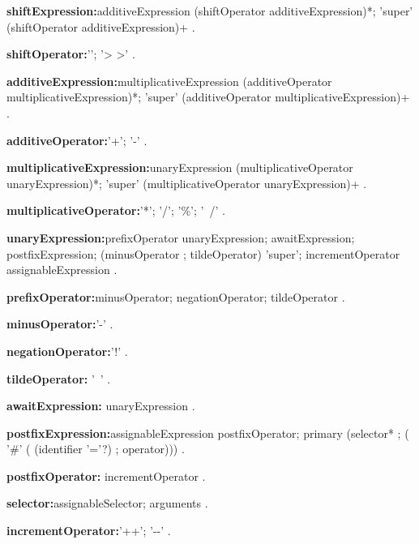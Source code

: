 \begin{grammar}
{\bf shiftExpression:}additiveExpression (shiftOperator additiveExpression)*;
      'super' (shiftOperator additiveExpression)+
    .

{\bf shiftOperator:}'\lt\lt';
       '> >' 
    .
 \end{grammar}
\begin{grammar}
{\bf additiveExpression:}multiplicativeExpression (additiveOperator multiplicativeExpression)*;
      'super' (additiveOperator multiplicativeExpression)+
    .

{\bf additiveOperator:}'+';
      '-'
    .
 \end{grammar}
\begin{grammar}
{\bf multiplicativeExpression:}unaryExpression (multiplicativeOperator unaryExpression)*;
      'super' (multiplicativeOperator unaryExpression)+
    .

{\bf multiplicativeOperator:}'*';
      '/';
      '\%';
      '~/'
    .
    
 \end{grammar}
\begin{grammar}
{\bf unaryExpression:}prefixOperator unaryExpression;
      awaitExpression;
      postfixExpression;
      (minusOperator ; tildeOperator) 'super';
      incrementOperator assignableExpression
    .
 
 {\bf prefixOperator:}minusOperator;
      negationOperator;
      tildeOperator
    .
       
       
  {\bf minusOperator:}'-'
  .


    {\bf negationOperator:}'!'
      .
      
    {\bf tildeOperator:}  '~'
    .
    
    
\end{grammar}
\begin{grammar}
{\bf awaitExpression:}
      \AWAIT{} unaryExpression
      .
 \end{grammar}
\begin{grammar}
{\bf postfixExpression:}assignableExpression postfixOperator;
      primary (selector* ; ( '\#' ( (identifier '='?) ; operator)))
    .

{\bf postfixOperator:}
      incrementOperator
    .

{\bf selector:}assignableSelector;
      arguments
    .

{\bf incrementOperator:}'++';
      '-{}-'
    .
        
 \end{grammar}

